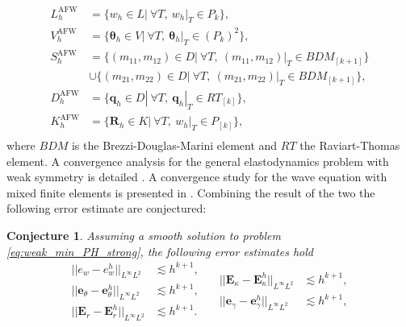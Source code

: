 \documentclass{ifacconf}
\newtheorem{conjecture}{Conjecture}
\begin{document}
\begin{equation*}
\begin{aligned}
L_h^{\text{AFW}} &= \{w_h \in L | \ \forall T, \ w_h|_{T} \in P_k \}, \\
V_h^{\text{AFW}} &= \{\bm{\theta}_h \in V | \ \forall T,\ \bm{\theta}_h|_{T} \in (P_k)^2 \}, \\
S_h^{\text{AFW}} &= \{(m_{11}, m_{12}) \in D| \ \forall T,\ (m_{11}, m_{12})|_{T} \in BDM_{[k+1]} \}  \\
& \cup \{(m_{21}, m_{22}) \in D| \ \forall T,\ (m_{21}, m_{22})|_{T} \in BDM_{[k+1]} \}, \\
D_h^{\text{AFW}} &= \{\bm{q}_h \in D | \ \forall T,\ \bm{q}_h|_{T} \in RT_{[k]} \}, \\
K_h^{\text{AFW}} &= \{\bm{R}_h \in K | \ \forall T, \ w_h|_{T} \in P_{[k]} \}, \\ 
\end{aligned}
\end{equation*}
where $BDM$ is the Brezzi-Douglas-Marini element and $RT$ the Raviart-Thomas element. A convergence analysis for the general elastodynamics problem with weak symmetry is detailed \cite{ArnoldWeak}. A convergence study for the wave equation with mixed finite elements is presented in \cite{Geveci}. Combining the result of the two the following error estimate are conjectured:
\begin{conjecture}
	Assuming a smooth solution to problem \eqref{eq:weak_min_PH_strong}, the following error estimates hold 
	\begin{equation}
	\begin{aligned}
	||e_w - e_w^h||_{L^{\infty} L^2} &\lesssim h^{k+1}, \\
	||\bm{e}_\theta - \bm{e}_\theta^h||_{L^{\infty} L^2} &\lesssim h^{k+1}, \\
	||\bm{E}_r - \bm{E}_r^h||_{L^{\infty} L^2} &\lesssim h^{k+1}. \\
	\end{aligned} \quad
	\begin{aligned}
	||\bm{E}_\kappa - \bm{E}_\kappa^h||_{L^{\infty} L^2} &\lesssim  h^{k+1}, \\
	||\bm{e}_\gamma - \bm{e}_\gamma^ h||_{L^{\infty} L^2} &\lesssim  h^{k+1}, \\
	\end{aligned} 
	\end{equation}
\end{conjecture}
\end{document}
